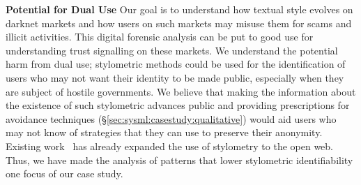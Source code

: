 \noindent \textbf{Potential for Dual Use} Our goal is to understand how textual style evolves on darknet markets and how users on such markets may misuse them for scams and illicit activities. This digital forensic analysis can be put to good use for understanding trust signalling on these markets.
We understand the potential harm from dual use; stylometric methods could be used for the identification of users who may not want their identity to be made public, especially when they are subject of hostile governments.
We believe that making the information about the existence of such stylometric advances public and providing prescriptions for avoidance techniques (\S\ref{sec:sysml:casestudy:qualitative}) would aid users who may not know of strategies that they can use to preserve their anonymity.
Existing work~\cite{noorshams2020ties,andrews2019learning} has already expanded the use of stylometry to the open web. 
Thus, we have made the analysis of patterns that lower stylometric identifiability one focus of our case study.

